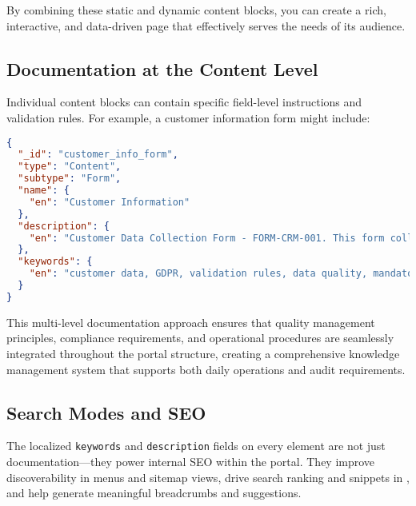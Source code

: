 By combining these static and dynamic content blocks, you can create a rich, interactive, and data-driven page that effectively serves the needs of its audience.

\subsection{Documentation at the Content Level}
\label{sec:content-documentation}

Individual content blocks can contain specific field-level instructions and validation rules. For example, a customer information form might include:

\begin{lstlisting}[language=JSON,caption={Content with Field-Level Documentation},label={lst:form-content-docs}]
{
  "_id": "customer_info_form",
  "type": "Content",
  "subtype": "Form",
  "name": {
    "en": "Customer Information"
  },
  "description": {
    "en": "Customer Data Collection Form - FORM-CRM-001. This form collects essential customer information required for quote generation. All fields marked with (*) are mandatory as per our Customer Data Policy CDP-001. Data Validation Rules: Company Name (min 2, max 100 chars), Email (valid business format). Data Protection Notice: Customer data is processed according to GDPR Article 6(1)(b). Data retention period: 7 years."
  },
  "keywords": {
    "en": "customer data, GDPR, validation rules, data quality, mandatory fields"
  }
}
\end{lstlisting}

This multi-level documentation approach ensures that quality management principles, compliance requirements, and operational procedures are seamlessly integrated throughout the portal structure, creating a comprehensive knowledge management system that supports both daily operations and audit requirements.

\subsection{Search Modes and SEO}
\label{sec:search-and-seo}

The localized \texttt{keywords} and \texttt{description} fields on every \wbdl{} element are not just documentation—they power internal SEO within the portal. They improve discoverability in menus and sitemap views, drive search ranking and snippets in \studio{}, and help generate meaningful breadcrumbs and suggestions.

